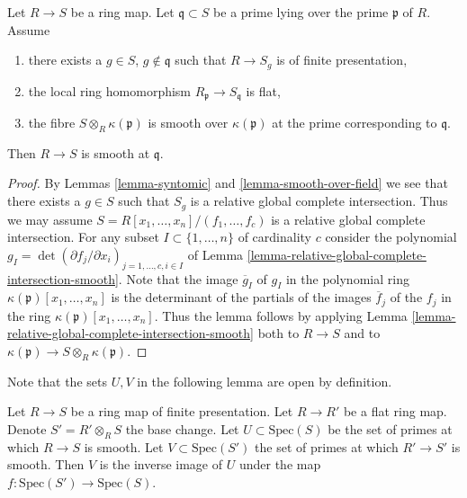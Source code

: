 \begin{lemma}
\label{lemma-flat-fibre-smooth}
Let $R \to S$ be a ring map.
Let $\mathfrak q \subset S$ be a prime lying over the
prime $\mathfrak p$ of $R$. Assume
\begin{enumerate}
\item there exists a $g \in S$, $g \not\in \mathfrak q$
such that $R \to S_g$ is of finite presentation,
\item the local ring homomorphism
$R_{\mathfrak p} \to S_{\mathfrak q}$ is flat,
\item the fibre $S \otimes_R \kappa(\mathfrak p)$ is smooth
over $\kappa(\mathfrak p)$ at the prime corresponding
to $\mathfrak q$.
\end{enumerate}
Then $R \to S$ is smooth at $\mathfrak q$.
\end{lemma}

\begin{proof}
By Lemmas \ref{lemma-syntomic} and \ref{lemma-smooth-over-field}
we see that there exists a $g \in S$ such that $S_g$ is a
relative global complete intersection. Thus we may assume
$S = R[x_1, \ldots, x_n]/(f_1, \ldots, f_c)$ is a relative
global complete intersection.
For any subset $I \subset \{1, \ldots, n\}$ of cardinality
$c$ consider the polynomial
$g_I = \det (\partial f_j/\partial x_i)_{j = 1, \ldots, c, i \in I}$
of Lemma \ref{lemma-relative-global-complete-intersection-smooth}.
Note that the image $\overline{g}_I$ of $g_I$ in the polynomial ring
$\kappa(\mathfrak p)[x_1, \ldots, x_n]$ is the determinant
of the partials of the images $\overline{f}_j$ of the $f_j$ in the ring
$\kappa(\mathfrak p)[x_1, \ldots, x_n]$. Thus the lemma follows
by applying Lemma \ref{lemma-relative-global-complete-intersection-smooth}
both to $R \to S$ and to
$\kappa(\mathfrak p) \to S \otimes_R \kappa(\mathfrak p)$.
\end{proof}

\noindent
Note that the sets $U, V$ in the following lemma
are open by definition.

\begin{lemma}
\label{lemma-flat-base-change-locus-smooth}
Let $R \to S$ be a ring map of finite presentation.
Let $R \to R'$ be a flat ring map.
Denote $S' = R' \otimes_R S$ the base change.
Let $U \subset \text{Spec}(S)$ be the set of primes at
which $R \to S$ is smooth.
Let $V \subset \text{Spec}(S')$ the set of primes at
which $R' \to S'$ is smooth.
Then $V$ is the inverse image of $U$ under the
map $f : \text{Spec}(S') \to \text{Spec}(S)$.
\end{lemma}

